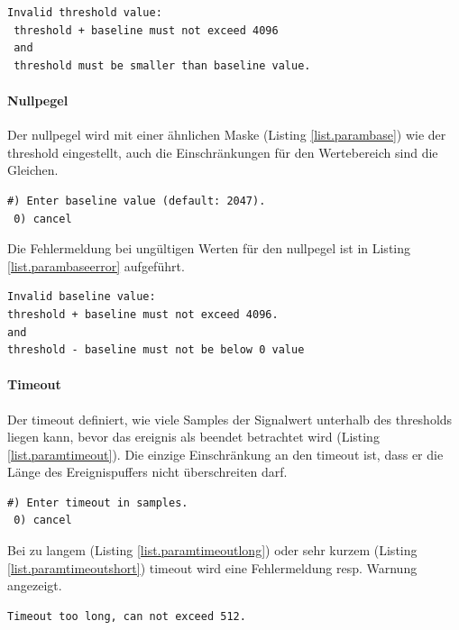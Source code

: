 \begin{lstlisting}[caption=Fehlermeldung ungültiger Threshold, label=list.paramthresfail]
 Invalid threshold value:
 threshold + baseline must not exceed 4096
 and
 threshold must be smaller than baseline value.
\end{lstlisting}

\paragraph{Nullpegel} Der \gls{nullpegel} wird mit einer ähnlichen Maske (Listing \ref{list.parambase}) wie der \gls{threshold} eingestellt, auch die Einschränkungen für den Wertebereich sind die Gleichen.

\begin{lstlisting}[caption=Untermenü Null-Level, label=list.parambase]
 #) Enter baseline value (default: 2047).
 0) cancel
\end{lstlisting}

Die Fehlermeldung bei ungültigen Werten für den \gls{nullpegel} ist in Listing \ref{list.parambaseerror} aufgeführt.

\begin{lstlisting}[caption=Fehlermeldung ungültiger Nullpegel, label=list.parambaseerror]
Invalid baseline value:
threshold + baseline must not exceed 4096.
and
threshold - baseline must not be below 0 value
\end{lstlisting}

\paragraph{Timeout} Der \gls{timeout} definiert, wie viele Samples der Signalwert unterhalb des \gls{threshold}s liegen kann, bevor das \gls{ereignis} als beendet betrachtet wird (Listing \ref{list.paramtimeout}). Die einzige Einschränkung an den \gls{timeout} ist, dass er die Länge des Ereignispuffers nicht überschreiten darf.

\begin{lstlisting}[caption=Untermenü Timeout, label=list.paramtimeout]
 #) Enter timeout in samples.
 0) cancel
\end{lstlisting}

Bei zu langem (Listing \ref{list.paramtimeoutlong}) oder sehr kurzem (Listing \ref{list.paramtimeoutshort}) \gls{timeout} wird eine Fehlermeldung resp. Warnung angezeigt.

\begin{lstlisting}[caption=Fehlermeldung zu langer Timeout, label=list.paramtimeoutlong]
Timeout too long, can not exceed 512.
\end{lstlisting}

